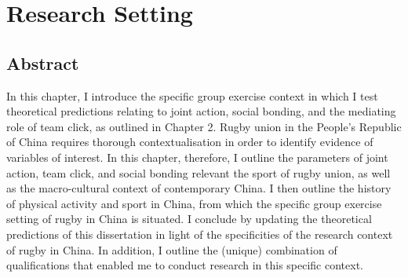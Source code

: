 
\chapter{\label{researchSetting}Research Setting}


\minitoc




\section{Abstract}


In this chapter, I introduce the specific group exercise context in which I test theoretical predictions relating to joint action, social bonding, and the mediating role of team click, as outlined in Chapter 2.  Rugby union in the People's Republic of China requires thorough contextualisation in order to identify evidence of variables of interest.  In this chapter, therefore, I outline the parameters of joint action, team click, and social bonding relevant the sport of rugby union, as well as the macro-cultural context of contemporary China.  I then outline the history of physical activity and sport in China, from which the specific group exercise setting of rugby in China is situated.  I conclude by updating the theoretical predictions of this dissertation in light of the specificities of the research context of rugby in China. In addition, I outline the (unique) combination of qualifications that enabled me to conduct research in this specific context.


